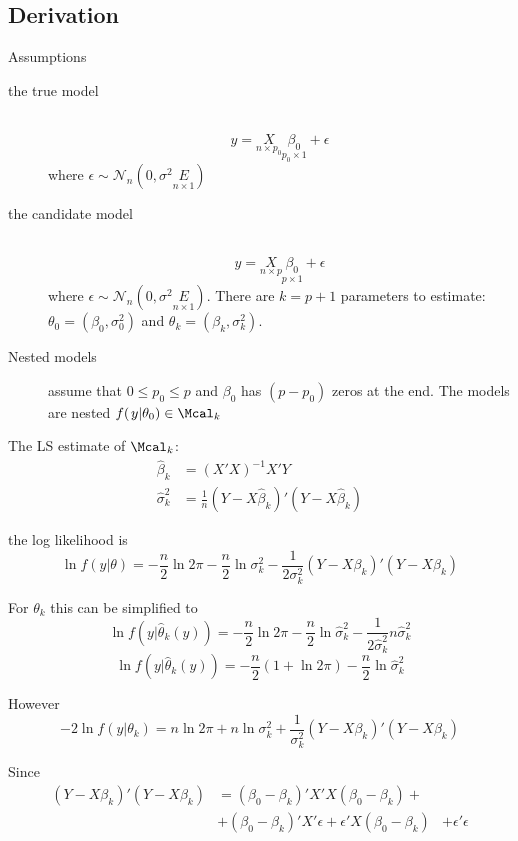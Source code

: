 \documentclass[a4paper]{article}
\newcommand{\brac}[1]{{\left ( #1 \right )}}
\newcommand{\induc}[1]{{\left . #1 \right \vert}}
\newcommand{\Ncal}{\mathcal{N}}
\begin{document}
\subsection{Derivation} %
\label{sub:derivation}
Assumptions \begin{description}
	\item[the true model]\hfill\\
	\[y = \underset{n\times p_0}{X}\underset{p_0\times 1}{\beta_0} + \epsilon\]
	where $\epsilon \sim \Ncal_n\brac{0,\sigma^2 \underset{n\times 1}{E}}$
	\item[the candidate model] \hfill\\
	\[y = \underset{n\times p}{X}\underset{p\times 1}{\beta_0} + \epsilon\]
	where $\epsilon \sim \Ncal_n\brac{0,\sigma^2 \underset{n\times 1}{E}}$.
	There are $k=p+1$ parameters to estimate: $\theta_0 = \brac{\beta_0,\sigma_0^2}$ and $\theta_k = \brac{\beta_k,\sigma_k^2}$.
	\item[Nested models] assume that $0\leq p_0 \leq p$ and $\beta_0$ has $(p-p_0)$ zeros at the end. The models are nested $f\brac{\induc{y}\theta_0}\in \Mcal_k$
\end{description}

The LS estimate of $\Mcal_k$:\begin{align*}
	\hat{\beta}_k &= \brac{X'X}^{-1} X'Y\\
	\hat{\sigma}^2_k &= \frac{1}{n}\brac{Y-X\hat{\beta}_k}'\brac{Y-X\hat{\beta}_k}
\end{align*}


the log likelihood is 
\[\ln f\brac{\induc{y}\theta} = -\frac{n}{2} \ln 2\pi -\frac{n}{2}\ln \sigma^2_k - \frac{1}{2\sigma^2_k} \brac{Y-X\beta_k}'\brac{Y-X\beta_k}\]

For $\theta_k$ this can be simplified to 
\[\ln f\brac{\induc{y}\hat{\theta}_k(y)} = -\frac{n}{2} \ln 2\pi -\frac{n}{2}\ln \hat{\sigma}^2_k - \frac{1}{2\hat{\sigma}^2_k} n \hat{\sigma}^2_k \]
\[\ln f\brac{\induc{y}\hat{\theta}_k(y)} = -\frac{n}{2} \brac{ 1 + \ln 2\pi} -\frac{n}{2}\ln \hat{\sigma}^2_k\]

However
\[-2\ln f\brac{\induc{y}\theta_k} = n \ln 2\pi +n\ln \sigma^2_k + \frac{1}{\sigma^2_k} \brac{Y-X\beta_k}'\brac{Y-X\beta_k}\]

Since 
\begin{align*}
	\brac{Y-X\beta_k}'\brac{Y-X\beta_k} &= \brac{\beta_0-\beta_k}'X'X\brac{\beta_0-\beta_k} + \\
		& + \brac{\beta_0 - \beta_k}'X'\epsilon + \epsilon'X\brac{\beta_0 - \beta_k}
		& + \epsilon'\epsilon
\end{align*}
\end{document}
